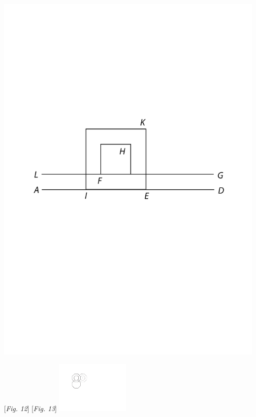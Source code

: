 \begin{minipage}[b] {0.5\textwidth}
\includegraphics[trim = 0mm 0mm 0mm 0mm, clip, width=1.0\textwidth]{images/lh03705_009r-d5.pdf}
\end{minipage}
\pend
\vspace{0.3em}
\pstart
\hspace{10mm}  [\textit{Fig. 12}] \hspace{60mm} [\textit{Fig. 13}]
\pend
\vspace{1em}
\pstart                                
  \noindent \centering \includegraphics[trim = 0mm -4mm 0mm 0mm, clip, width=0.27\textwidth]{images/lh03705_009r-d6.pdf}\\
